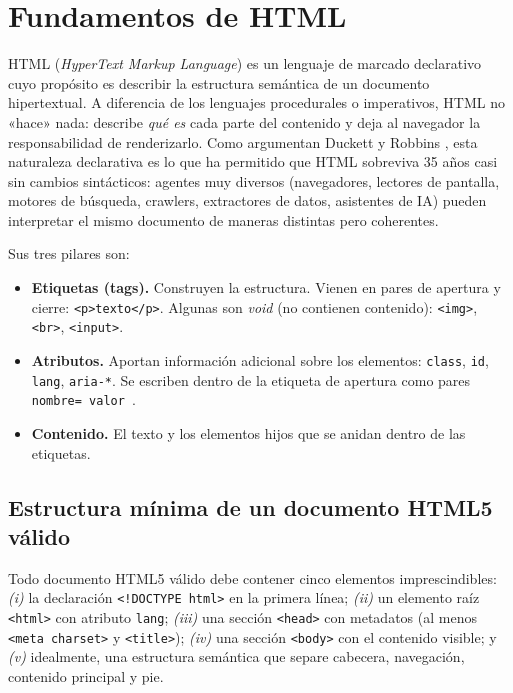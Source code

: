 \documentclass[11pt,a4paper,openany]{book}
\begin{document}
\section{Fundamentos de HTML}

HTML (\emph{HyperText Markup Language}) es un lenguaje de marcado
declarativo cuyo propósito es describir la estructura semántica de
un documento hipertextual. A diferencia de los lenguajes
procedurales o imperativos, HTML no «hace» nada: describe
\emph{qué es} cada parte del contenido y deja al navegador la
responsabilidad de renderizarlo. Como argumentan Duckett
\cite{duckett2011html} y Robbins \cite{robbins2018learning}, esta
naturaleza declarativa es lo que ha permitido que HTML sobreviva 35
años casi sin cambios sintácticos: agentes muy diversos
(navegadores, lectores de pantalla, motores de búsqueda, crawlers,
extractores de datos, asistentes de IA) pueden interpretar el mismo
documento de maneras distintas pero coherentes.

Sus tres pilares son:

\begin{itemize}
\item \textbf{Etiquetas (tags).} Construyen la estructura. Vienen
en pares de apertura y cierre: \texttt{<p>texto</p>}. Algunas son
\emph{void} (no contienen contenido): \texttt{<img>}, \texttt{<br>},
\texttt{<input>}.
\item \textbf{Atributos.} Aportan información adicional sobre los
elementos: \texttt{class}, \texttt{id}, \texttt{lang},
\texttt{aria-*}. Se escriben dentro de la etiqueta de apertura como
pares \texttt{nombre= valor }.
\item \textbf{Contenido.} El texto y los elementos hijos que se
anidan dentro de las etiquetas.
\end{itemize}

\subsection{Estructura mínima de un documento HTML5 válido}

Todo documento HTML5 válido debe contener cinco elementos
imprescindibles: \emph{(i)} la declaración \texttt{<!DOCTYPE html>}
en la primera línea; \emph{(ii)} un elemento raíz \texttt{<html>} con
atributo \texttt{lang}; \emph{(iii)} una sección \texttt{<head>} con
metadatos (al menos \texttt{<meta charset>} y \texttt{<title>});
\emph{(iv)} una sección \texttt{<body>} con el contenido visible; y
\emph{(v)} idealmente, una estructura semántica que separe cabecera,
navegación, contenido principal y pie.
\end{document}
